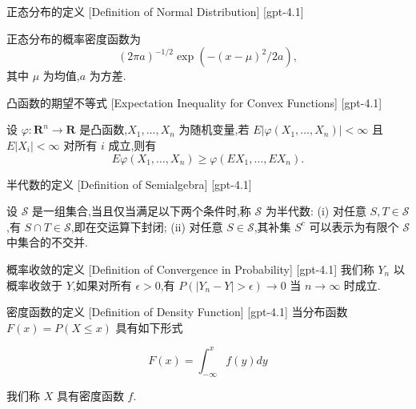 \documentclass[UTF8]{ctexart}
\begin{document}
    
    
    \begin{dfn}
        {正态分布的定义}
        [Definition of Normal Distribution]
        [gpt-4.1]
        
正态分布的概率密度函数为
\[
(2\pi a)^{-1/2} \exp\left( - (x - \mu)^2 / 2a \right),
\]
其中 $\mu$ 为均值,$a$ 为方差.

    \end{dfn}
    
    
    
    \begin{thm}
        {凸函数的期望不等式}
        [Expectation Inequality for Convex Functions]
        [gpt-4.1]
        
设 $\varphi : \mathbf{R}^n \to \mathbf{R}$ 是凸函数,$X_1,\ldots,X_n$ 为随机变量,若 $E|\varphi(X_1, \ldots, X_n)| < \infty$ 且 $E|X_i| < \infty$ 对所有 $i$ 成立,则有
\[
E \varphi(X_1, \ldots, X_n) \geq \varphi(E X_1, \ldots, E X_n).
\]

    \end{thm}
    
    
    
    \begin{dfn}
        {半代数的定义}
        [Definition of Semialgebra]
        [gpt-4.1]
        
设 $\mathcal{S}$ 是一组集合,当且仅当满足以下两个条件时,称 $\mathcal{S}$ 为半代数:
(i) 对任意 $S, T \in \mathcal{S}$,有 $S \cap T \in \mathcal{S}$,即在交运算下封闭;
(ii) 对任意 $S \in \mathcal{S}$,其补集 $S^c$ 可以表示为有限个 $\mathcal{S}$ 中集合的不交并.

    \end{dfn}
    
    
    
    \begin{dfn}
        {概率收敛的定义}
        [Definition of Convergence in Probability]
        [gpt-4.1]
        我们称 $Y_n$ 以概率收敛于 $Y$,如果对所有 $\epsilon > 0$,有 $P(|Y_n - Y| > \epsilon) \to 0$ 当 $n \to \infty$ 时成立.
    \end{dfn}
    
    
    
    \begin{dfn}
        {密度函数的定义}
        [Definition of Density Function]
        [gpt-4.1]
        当分布函数 $F(x) = P(X \leq x)$ 具有如下形式

\[
F(x) = \int_{-\infty}^x f(y) dy
\]

我们称 $X$ 具有密度函数 $f$.
    \end{dfn}
    
\end{document}
